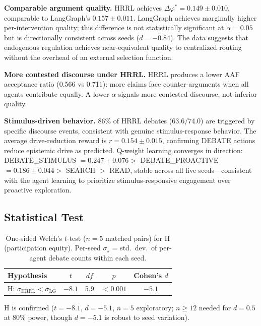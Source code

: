 \documentclass{llncs}
\begin{document}
\textbf{Comparable argument quality.} HRRL achieves $\Delta\varphi^* =
0.149 \pm 0.010$, comparable to LangGraph's $0.157 \pm 0.011$. LangGraph
achieves marginally higher per-intervention quality; this difference is
not statistically significant at $\alpha = 0.05$ but is directionally
consistent across seeds ($d = -0.84$). The data suggests that endogenous
regulation achieves near-equivalent quality to centralized routing without
the overhead of an external selection function.

\textbf{More contested discourse under HRRL.} HRRL produces a lower AAF
acceptance ratio (0.566 vs 0.711): more claims face counter-arguments
when all agents contribute equally. A lower $\alpha$ signals more
contested discourse, not inferior quality.

\textbf{Stimulus-driven behavior.} 86\% of HRRL debates (63.6/74.0) are
triggered by specific discourse events, consistent with genuine
stimulus-response behavior. The average drive-reduction reward is
$r = 0.154 \pm 0.015$, confirming DEBATE actions reduce epistemic drive
as predicted. Q-weight learning converges in direction: DEBATE\_STIMULUS
$= 0.247 \pm 0.076 >$ DEBATE\_PROACTIVE $= 0.186 \pm 0.044 >$ SEARCH $>$
READ, stable across all five seeds---consistent with the agent learning to
prioritize stimulus-responsive engagement over proactive exploration.

\subsection{Statistical Test}

\begin{table}
\caption{One-sided Welch's $t$-test ($n=5$ matched pairs) for H
(participation equity). Per-seed $\sigma_s$ = std.\ dev.\ of per-agent
debate counts within each seed.}\label{tab:stats}
\begin{tabular}{|l|c|c|c|c|}
\hline
\textbf{Hypothesis} & \textbf{$t$} & \textbf{$df$} & \textbf{$p$} &
\textbf{Cohen's $d$} \\
\hline
H: $\sigma_{\text{HRRL}} < \sigma_{\text{LG}}$ & $-8.1$ & 5.9 & $< 0.001$ & $-5.1$ \\
\hline
\end{tabular}
\end{table}

H is confirmed ($t = -8.1$, $d = -5.1$, $n=5$ exploratory; $n\geq 12$
needed for $d=0.5$ at 80\% power, though $d=-5.1$ is robust to seed
variation).


\end{document}
